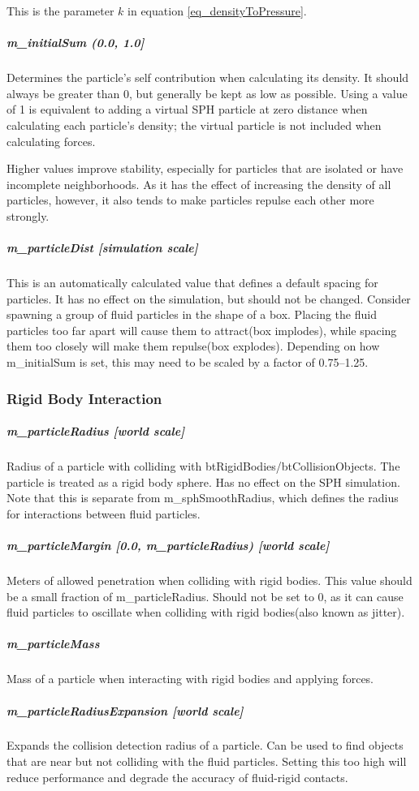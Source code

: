 \documentclass[]{article}
\begin{document}
				This is the parameter \(k\) in equation \ref{eq_densityToPressure}.
			
			\subparagraph{m\_initialSum (0.0, 1.0]}
				Determines the particle's self contribution when calculating its density. It should always be greater than 0,
				but generally be kept as low as possible. Using a value of 1 is equivalent to adding a virtual SPH particle at zero distance
				when calculating each particle's density; the virtual particle is not included when calculating forces.
				
				Higher values improve stability, especially for particles that are isolated or have incomplete neighborhoods. 
				As it has the effect of increasing the density of all particles, however, it also tends to make particles repulse
				each other more strongly.
				
			\subparagraph{m\_particleDist [simulation scale]}
				This is an automatically calculated value that defines a default spacing for particles. It has no effect on
				the simulation, but should not be changed. Consider spawning a group of fluid particles in the shape of a 
				box. Placing the fluid particles too far apart will cause them to attract(box implodes), while spacing them
				too closely will make them repulse(box explodes). Depending on how m\_initialSum is set, this may need to
				be scaled by a factor of 0.75--1.25.
		
		\subsubsection{Rigid Body Interaction}
			\subparagraph{m\_particleRadius [world scale]}
				Radius of a particle with colliding with btRigidBodies/btCollisionObjects. The particle is treated as a rigid body sphere.
				Has no effect on the SPH simulation. Note that this is separate from m\_sphSmoothRadius, which defines the radius for
				interactions between fluid particles.
				
			\subparagraph{m\_particleMargin [0.0, m\_particleRadius) [world scale]}
				Meters of allowed penetration when colliding with rigid bodies. This value should be a small fraction of
				m\_particleRadius. Should not be set to 0, as it can cause fluid particles to oscillate when colliding
				with rigid bodies(also known as jitter).
				
			\subparagraph{m\_particleMass}
				Mass of a particle when interacting with rigid bodies and applying forces.
				
			\subparagraph{m\_particleRadiusExpansion [world scale]}
				Expands the collision detection radius of a particle. Can be used to find objects that are near but not
				colliding with the fluid particles. Setting this too high will reduce performance and degrade the accuracy
				of fluid-rigid contacts.
				
\end{document}
